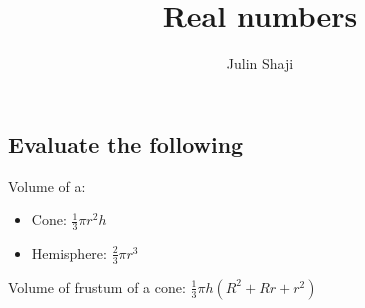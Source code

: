 \documentclass[12pt]{exam}
\title{Real numbers}
\author{Julin Shaji}
\date{}
\begin{document}
\maketitle
\printanswers

\begin{questions}
\section{Evaluate the following}


\begin{solution}
Volume of a:
\begin{itemize}
\item Cone: $\frac{1}{3}\pi r^2h$
\item Hemisphere: $\frac{2}{3}\pi r^3$
\end{itemize}
\end{solution}



\begin{solution}
Volume of frustum of a cone: $\frac{1}{3}\pi h(R^2 + Rr + r^2)$
\end{solution}
\end{questions}
\end{document}
